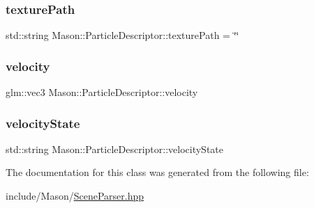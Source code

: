 \hypertarget{class_mason_1_1_particle_descriptor_a060bb2c95075b3a19432beca816bfa76}{}\label{class_mason_1_1_particle_descriptor_a060bb2c95075b3a19432beca816bfa76} 
\subsubsection{\texorpdfstring{texture\+Path}{texturePath}}
{\footnotesize\ttfamily std\+::string Mason\+::\+Particle\+Descriptor\+::texture\+Path = \char`\"{}\char`\"{}}

\hypertarget{class_mason_1_1_particle_descriptor_a015f949d8089667eea16540fb750f70a}{}\label{class_mason_1_1_particle_descriptor_a015f949d8089667eea16540fb750f70a} 
\subsubsection{\texorpdfstring{velocity}{velocity}}
{\footnotesize\ttfamily glm\+::vec3 Mason\+::\+Particle\+Descriptor\+::velocity}

\hypertarget{class_mason_1_1_particle_descriptor_ac84b802189304538944403fdff16faf2}{}\label{class_mason_1_1_particle_descriptor_ac84b802189304538944403fdff16faf2} 
\subsubsection{\texorpdfstring{velocity\+State}{velocityState}}
{\footnotesize\ttfamily std\+::string Mason\+::\+Particle\+Descriptor\+::velocity\+State}



The documentation for this class was generated from the following file\+:\begin{DoxyCompactItemize}
\item 
include/\+Mason/\hyperlink{_scene_parser_8hpp}{Scene\+Parser.\+hpp}\end{DoxyCompactItemize}
